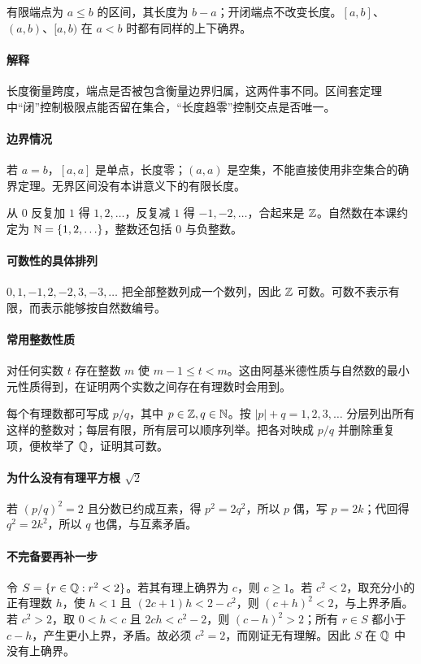 有限端点为 $a\le b$ 的区间，其长度为 $b-a$；开闭端点不改变长度。$[a,b]$、$(a,b)$、$[a,b)$ 在 $a<b$ 时都有同样的上下确界。
\paragraph{解释}长度衡量跨度，端点是否被包含衡量边界归属，这两件事不同。区间套定理中“闭”控制极限点能否留在集合，“长度趋零”控制交点是否唯一。
\paragraph{边界情况}若 $a=b$，$[a,a]$ 是单点，长度零；$(a,a)$ 是空集，不能直接使用非空集合的确界定理。无界区间没有本讲意义下的有限长度。

从 $0$ 反复加 $1$ 得 $1,2,\ldots$，反复减 $1$ 得 $-1,-2,\ldots$，合起来是 $\mathbb{Z}$。自然数在本课约定为 $\mathbb{N}=\{1,2,\ldots\}$，整数还包括 $0$ 与负整数。
\paragraph{可数性的具体排列}$0,1,-1,2,-2,3,-3,\ldots$ 把全部整数列成一个数列，因此 $\mathbb{Z}$ 可数。可数不表示有限，而表示能够按自然数编号。
\paragraph{常用整数性质}对任何实数 $t$ 存在整数 $m$ 使 $m-1\le t<m$。这由阿基米德性质与自然数的最小元性质得到，在证明两个实数之间存在有理数时会用到。

每个有理数都可写成 $p/q$，其中 $p\in\mathbb{Z},q\in\mathbb{N}$。按 $|p|+q=1,2,3,\ldots$ 分层列出所有这样的整数对；每层有限，所有层可以顺序列举。把各对映成 $p/q$ 并删除重复项，便枚举了 $\mathbb{Q}$，证明其可数。
\paragraph{为什么没有有理平方根 $\sqrt2$}若 $(p/q)^2=2$ 且分数已约成互素，得 $p^2=2q^2$，所以 $p$ 偶，写 $p=2k$；代回得 $q^2=2k^2$，所以 $q$ 也偶，与互素矛盾。
\paragraph{不完备要再补一步}令 $S=\{r\in\mathbb{Q}:r^2<2\}$。若其有理上确界为 $c$，则 $c\ge1$。若 $c^2<2$，取充分小的正有理数 $h$，使 $h<1$ 且 $(2c+1)h<2-c^2$，则 $(c+h)^2<2$，与上界矛盾。若 $c^2>2$，取 $0<h<c$ 且 $2ch<c^2-2$，则 $(c-h)^2>2$；所有 $r\in S$ 都小于 $c-h$，产生更小上界，矛盾。故必须 $c^2=2$，而刚证无有理解。因此 $S$ 在 $\mathbb{Q}$ 中没有上确界。

